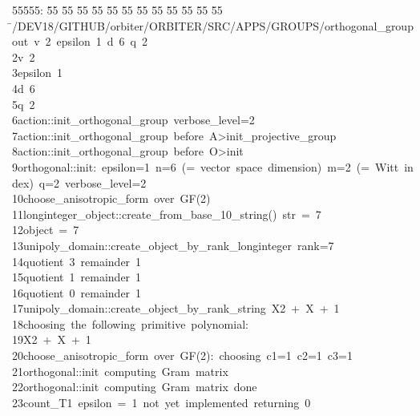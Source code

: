 %
%
\begin{tabbing}
55555: \= 55 \= 55 \= 55 \= 55 \= 55 \= 55 \= 55 \= 55 \= 55 \= 55 \= 55 \= 55 \= \>/DEV18/GITHUB/orbiter/ORBITER/SRC/APPS/GROUPS/orthogonal\_groupout\ v\ 2\ epsilon\ 1\ d\ 6\ q\ 2\\[0pt]
2\>v\ 2\\[0pt]
3\>epsilon\ 1\\[0pt]
4\>d\ 6\\[0pt]
5\>q\ 2\\[0pt]
6\>action::init\_orthogonal\_group\ verbose\_level=2\\[0pt]
7\>action::init\_orthogonal\_group\ before\ A>init\_projective\_group\\[0pt]
8\>action::init\_orthogonal\_group\ before\ O>init\\[0pt]
9\>orthogonal::init:\ epsilon=1\ n=6\ (=\ vector\ space\ dimension)\ m=2\ (=\ Witt\ index)\ q=2\ verbose\_level=2\\[0pt]
10\>choose\_anisotropic\_form\ over\ GF(2)\\[0pt]
11\>longinteger\_object::create\_from\_base\_10\_string()\ str\ =\ 7\\[0pt]
12\>object\ =\ 7\\[0pt]
13\>unipoly\_domain::create\_object\_by\_rank\_longinteger\ rank=7\\[0pt]
14\>quotient\ 3\ remainder\ 1\\[0pt]
15\>quotient\ 1\ remainder\ 1\\[0pt]
16\>quotient\ 0\ remainder\ 1\\[0pt]
17\>unipoly\_domain::create\_object\_by\_rank\_string\ X2\ +\ X\ +\ 1\\[0pt]
18\>choosing\ the\ following\ primitive\ polynomial:\\[0pt]
19\>X2\ +\ X\ +\ 1\\[0pt]
20\>choose\_anisotropic\_form\ over\ GF(2):\ choosing\ c1=1\ c2=1\ c3=1\\[0pt]
21\>orthogonal::init\ computing\ Gram\ matrix\\[0pt]
22\>orthogonal::init\ computing\ Gram\ matrix\ done\\[0pt]
23\>count\_T1\ epsilon\ =\ 1\ not\ yet\ implemented\ returning\ 0\\[0pt]

\end{tabbing}

